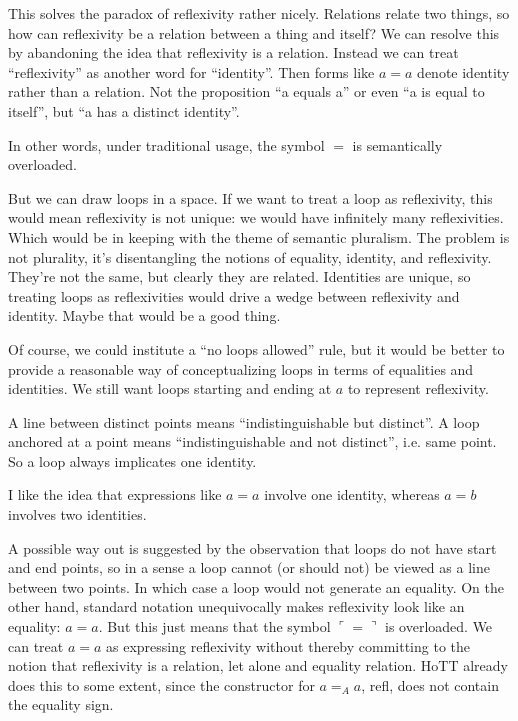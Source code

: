 \documentclass{article}
\begin{document}
This solves the paradox of reflexivity rather nicely. Relations relate
two things, so how can reflexivity be a relation between a thing and
itself? We can resolve this by abandoning the idea that reflexivity is
a relation. Instead we can treat ``reflexivity'' as another word for
``identity''. Then forms like \(a=a\) denote identity rather than a
relation. Not the proposition ``a equals a'' or even ``a is equal to
itself'', but ``a has a distinct identity''.

In other words, under traditional usage, the symbol \(=\) is
semantically overloaded.

But we can draw loops in a space. If we want to treat a loop as
reflexivity, this would mean reflexivity is not unique: we would have
infinitely many reflexivities. Which would be in keeping with the
theme of semantic pluralism. The problem is not plurality, it's
disentangling the notions of equality, identity, and reflexivity.
They're not the same, but clearly they are related. Identities are
unique, so treating loops as reflexivities would drive a wedge between
reflexivity and identity. Maybe that would be a good thing.

Of course, we could institute a ``no loops allowed'' rule, but it
would be better to provide a reasonable way of conceptualizing loops
in terms of equalities and identities. We still want loops starting
and ending at \(a\) to represent reflexivity.

A line between distinct points means ``indistinguishable but
distinct''. A loop anchored at a point means ``indistinguishable and
not distinct'', i.e. same point. So a loop always implicates one
identity.

I like the idea that expressions like \(a=a\) involve one identity,
whereas \(a=b\) involves two identities.

A possible way out is suggested by the observation that loops do not
have start and end points, so in a sense a loop cannot (or should not)
be viewed as a line between two points. In which case a loop would not
generate an equality. On the other hand, standard notation
unequivocally makes reflexivity look like an equality: \(a=a\). But
this just means that the symbol \(\ulcorner = \urcorner\) is
overloaded. We can treat \(a=a\) as expressing reflexivity without
thereby committing to the notion that reflexivity is a relation, let
alone and equality relation. HoTT already does this to some extent,
since the constructor for \(a=_A a\), \textsf{refl}, does not contain
the equality sign.
\end{document}
